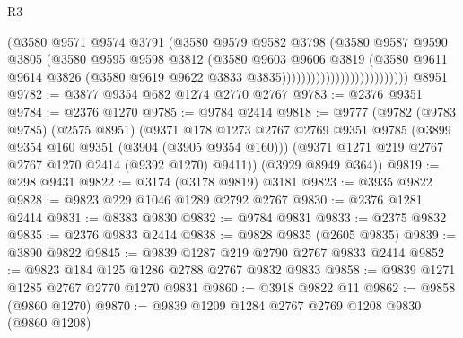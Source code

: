 \begin{lexlean}{R3}
\begin{coremodule}
                                          (@3580
                                            @9571
                                            @9574
                                            @3791
                                            (@3580
                                              @9579
                                              @9582
                                              @3798
                                              (@3580
                                                @9587
                                                @9590
                                                @3805
                                                (@3580
                                                  @9595
                                                  @9598
                                                  @3812
                                                  (@3580
                                                    @9603
                                                    @9606
                                                    @3819
                                                    (@3580
                                                      @9611
                                                      @9614
                                                      @3826
                                                      (@3580
                                                        @9619
                                                        @9622
                                                        @3833
                                                        @3835))))))))))))))))))))))))))
    @8951
@9782 := @3877 @9354 @682 @1274 @2770 @2767
@9783 := @2376 @9351
@9784 := @2376 @1270
@9785 := @9784 @2414
@9818 := @9777
    (@9782
      (@9783 @9785)
      (@2575 @8951)
      (@9371
        @178
        @1273
        @2767
        @2769
        @9351
        @9785
        (@3899 @9354 @160 @9351 (@3904 (@3905 @9354 @160)))
        (@9371 @1271 @219 @2767 @2767 @1270 @2414 (@9392 @1270) @9411))
      (@3929 @8949 @364))
@9819 := @298 @9431
@9822 := @3174 (@3178 @9819) @3181
@9823 := @3935 @9822
@9828 := @9823 @229 @1046 @1289 @2792 @2767
@9830 := @2376 @1281 @2414
@9831 := @8383 @9830
@9832 := @9784 @9831
@9833 := @2375 @9832
@9835 := @2376 @9833 @2414
@9838 := @9828 @9835 (@2605 @9835)
@9839 := @3890 @9822
@9845 := @9839 @1287 @219 @2790 @2767 @9833 @2414
@9852 := @9823 @184 @125 @1286 @2788 @2767 @9832 @9833
@9858 := @9839 @1271 @1285 @2767 @2770 @1270 @9831
@9860 := @3918 @9822 @11
@9862 := @9858 (@9860 @1270)
@9870 := @9839 @1209 @1284 @2767 @2769 @1208 @9830 (@9860 @1208)

\end{coremodule}
\end{lexlean}

